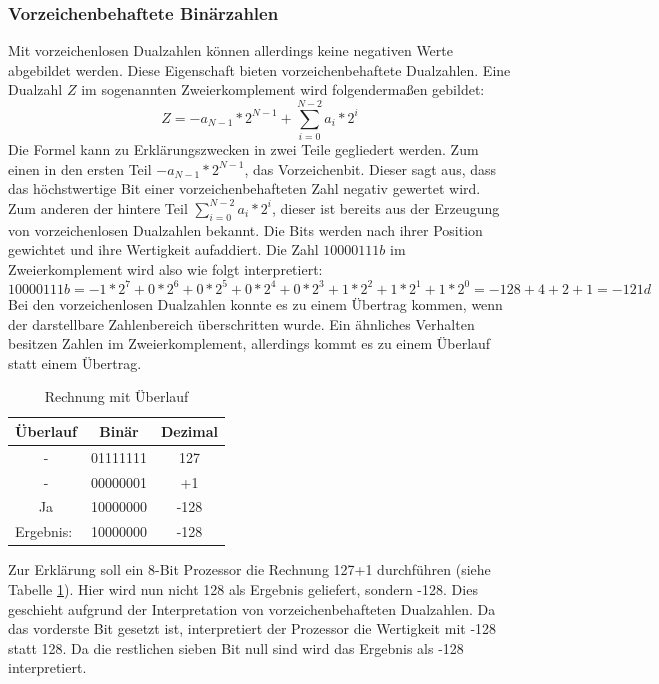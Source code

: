 \documentclass[12pt]{article}
\begin{document}
\subsubsection{Vorzeichenbehaftete Binärzahlen}
\noindent Mit vorzeichenlosen Dualzahlen können allerdings keine negativen Werte abgebildet werden. Diese Eigenschaft bieten vorzeichenbehaftete Dualzahlen. Eine Dualzahl $Z$ im sogenannten Zweierkomplement wird folgendermaßen gebildet:
$$Z=-a_{N-1}*2^{N-1}+\sum\limits_{i=0}^{N-2} a_i * 2^i$$
Die Formel kann zu Erklärungszwecken in zwei Teile gegliedert werden. Zum einen in den ersten Teil $-a_{N-1}*2^{N-1}$, das Vorzeichenbit. Dieser sagt aus, dass das höchstwertige Bit einer vorzeichenbehafteten Zahl negativ gewertet wird. Zum anderen der hintere Teil $\sum\limits_{i=0}^{N-2} a_i * 2^i$, dieser ist bereits aus der Erzeugung von vorzeichenlosen Dualzahlen bekannt. Die Bits werden nach ihrer Position gewichtet und ihre Wertigkeit aufaddiert. Die Zahl $10000111b$ im Zweierkomplement wird also wie folgt interpretiert:
$$10000111b = -1*2^7+0*2^6+0*2^5+0*2^4+0*2^3+1*2^2+1*2^1+1*2^0 = -128+4+2+1 = -121d$$
Bei den vorzeichenlosen Dualzahlen konnte es zu einem Übertrag kommen, wenn der darstellbare Zahlenbereich überschritten wurde. Ein ähnliches Verhalten besitzen Zahlen im Zweierkomplement, allerdings kommt es zu einem Überlauf statt einem Übertrag. 


\begin{table}[!htb]
\centering
\begin{tabular}{|c|c|c|}
\hline
\textbf{Überlauf}               & \multicolumn{1}{c|}{\textbf{Binär}} & \multicolumn{1}{c|}{\textbf{Dezimal}} \\ \hline
-                               & 01111111                            & 127                                   \\ \hline
-                               & 00000001                            & +1                                    \\ \hline
Ja                              & 10000000                            & -128                                  \\ \hline\hline
\multicolumn{1}{|l|}{Ergebnis:} & 10000000                            & -128                                  \\ \hline
\end{tabular}
\caption{Rechnung mit Überlauf}
\label{tab:ueberlauf}
\end{table}

\noindent Zur Erklärung soll ein 8-Bit Prozessor die Rechnung 127+1 durchführen (siehe Tabelle \ref{tab:ueberlauf}). Hier wird nun nicht 128 als Ergebnis geliefert, sondern -128. Dies geschieht aufgrund der Interpretation von vorzeichenbehafteten Dualzahlen. Da das vorderste Bit  gesetzt ist, interpretiert der Prozessor die Wertigkeit mit -128 statt 128. Da die restlichen sieben Bit null sind wird das Ergebnis als -128 interpretiert.
\end{document}
